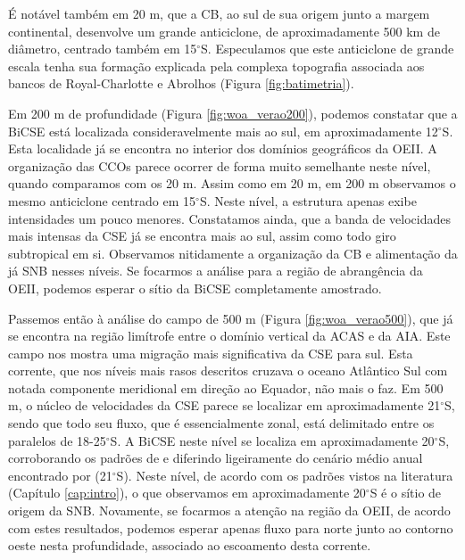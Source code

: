 É notável também em 20 m, que a CB, ao sul de sua origem junto a margem continental, desenvolve um grande 
anticiclone, de aproximadamente 500 km de diâmetro, centrado também em 15$^\circ$S. Especulamos que este anticiclone de
grande escala tenha sua for\-ma\-ção explicada pela complexa topografia associada aos bancos de Royal-Char\-lot\-te e 
Abrolhos (Figura \ref{fig:batimetria}). 

Em 200 m de profundidade (Figura \ref{fig:woa_verao200}), podemos constatar que a BiCSE está localizada consideravelmente mais ao sul, 
em aproximadamente 12$^\circ$S. Esta localidade já se encontra no interior dos domínios geográficos da
OEII. A organização das CCOs parece ocorrer de forma muito semelhante neste nível, quando comparamos 
com os 20 m. Assim como em 20 m, em 200 m observamos o mesmo anticiclone
centrado em  15$^\circ$S. Neste nível, a estrutura apenas exibe intensidades um pouco menores.
Constatamos ainda, que
 a banda de velocidades mais intensas da CSE já se encontra mais ao sul, assim como todo giro subtropical em si. 
Observamos nitidamente a organização da CB e alimentação da já SNB nesses níveis. Se focarmos a análise
para a região de abrangência da OEII, podemos esperar o sítio da BiCSE completamente amostrado. 

Passemos então à análise do campo de 500 m (Figura \ref{fig:woa_verao500}), que já se encontra
na região limítrofe entre o domínio vertical da ACAS e da AIA. 
Este campo nos mostra uma migração mais significativa da CSE para sul. 
Esta corrente, que nos níveis mais rasos descritos cruzava o oceano Atlântico Sul com notada componente meridional em 
direção ao Equador, 
não mais o faz. Em 500 m, o núcleo de velocidades da CSE parece se localizar em aproximadamente 21$^\circ$S,
sendo que todo seu fluxo, que é essencialmente zonal, está delimitado entre os paralelos de 18-25$^\circ$S.
A BiCSE neste nível se localiza 
em aproximadamente 20$^\circ$S, corroborando os padrões de \cite{stramma_england1999} e diferindo 
ligeiramente do cenário médio anual encontrado por \cite{rodrigues_etal2006} (21$^\circ$S). Neste nível, de acordo
com os padrões vistos na literatura (Capítulo \ref{cap:intro}), o que observamos em aproximadamente 20$^\circ$S é
o sítio de origem da SNB. Novamente, se focarmos a atenção na região da OEII, de acordo com estes resultados, 
podemos esperar apenas fluxo para norte junto ao contorno oeste nesta profundidade, associado ao escoamento desta
corrente.  

